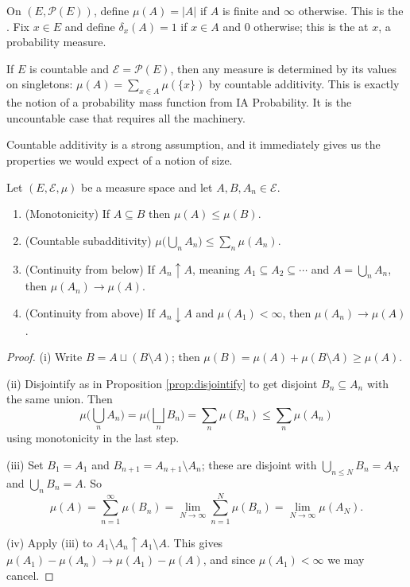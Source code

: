 \documentclass[a4paper]{scrartcl}
\newcommand{\cE}{\mathcal{E}}
\begin{document}
\begin{example}
	On $(E, \mathcal{P}(E))$, define $\mu(A) = |A|$ if $A$ is finite and $\infty$ otherwise. This is the . Fix $x \in E$ and define $\delta_x(A) = 1$ if $x \in A$ and $0$ otherwise; this is the  at $x$, a probability measure.
\end{example}

\begin{remark}
	If $E$ is countable and $\cE = \mathcal{P}(E)$, then any measure is determined by its values on singletons: $\mu(A) = \sum_{x \in A} \mu(\{x\})$ by countable additivity. This is exactly the notion of a probability mass function from IA Probability. It is the uncountable case that requires all the machinery.
\end{remark}

Countable additivity is a strong assumption, and it immediately gives us the properties we would expect of a notion of size.

\begin{proposition}\label{prop:measure-basic}
	Let $(E, \cE, \mu)$ be a measure space and let $A, B, A_n \in \cE$.
	\begin{enumerate}[label=(\roman*)]
		\item (Monotonicity) If $A \subseteq B$ then $\mu(A) \leq \mu(B)$.
		\item (Countable subadditivity) $\mu\big( \bigcup_n A_n \big) \leq \sum_n \mu(A_n)$.
		\item (Continuity from below) If $A_n \uparrow A$, meaning $A_1 \subseteq A_2 \subseteq \cdots$ and $A = \bigcup_n A_n$, then $\mu(A_n) \to \mu(A)$.
		\item (Continuity from above) If $A_n \downarrow A$ and $\mu(A_1) < \infty$, then $\mu(A_n) \to \mu(A)$.
	\end{enumerate}
\end{proposition}
\begin{proof}
	(i) Write $B = A \sqcup (B \setminus A)$; then $\mu(B) = \mu(A) + \mu(B\setminus A) \geq \mu(A)$.

	(ii) Disjointify as in Proposition \ref{prop:disjointify} to get disjoint $B_n \subseteq A_n$ with the same union. Then
	$$
	\mu\Big( \bigcup_n A_n \Big) = \mu\Big( \bigsqcup_n B_n \Big) = \sum_n \mu(B_n) \leq \sum_n \mu(A_n)
	$$
	using monotonicity in the last step.

	(iii) Set $B_1 = A_1$ and $B_{n+1} = A_{n+1} \setminus A_n$; these are disjoint with $\bigcup_{n \leq N} B_n = A_N$ and $\bigcup_n B_n = A$. So
	$$
	\mu(A) = \sum_{n=1}^\infty \mu(B_n) = \lim_{N \to \infty} \sum_{n=1}^N \mu(B_n) = \lim_{N\to\infty} \mu(A_N).
	$$

	(iv) Apply (iii) to $A_1 \setminus A_n \uparrow A_1 \setminus A$. This gives $\mu(A_1) - \mu(A_n) \to \mu(A_1) - \mu(A)$, and since $\mu(A_1) < \infty$ we may cancel.
\end{proof}
\end{document}
